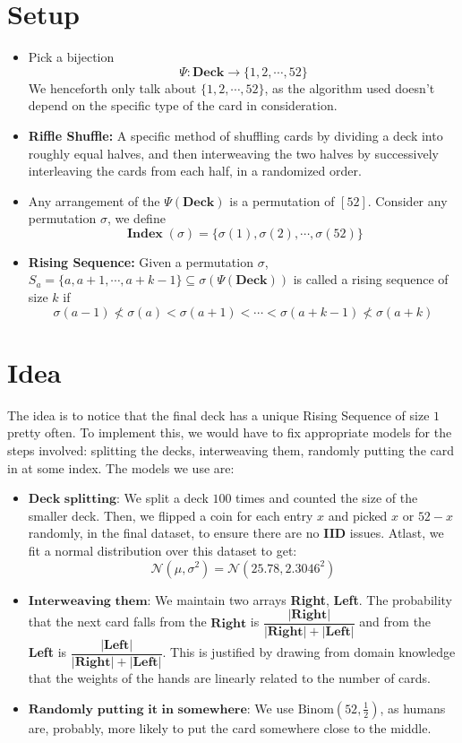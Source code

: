 \documentclass[a4paper]{article}
\DeclareMathOperator*{\Index}{\textbf{Index}}
\begin{document}
\section{Setup}
\begin{itemize}
    \item Pick a bijection $$\Psi:\textbf{Deck} \to \{1, 2, \cdots, 52\}$$ We 
    henceforth only talk about $\{1, 2, \cdots, 52\}$, as the algorithm used doesn't
    depend on the specific type of the card in consideration. 
    \item \textbf{Riffle Shuffle:} A specific method of shuffling cards by 
    dividing a deck into roughly equal halves, and then interweaving the two 
    halves by successively interleaving the cards from each half, in a randomized
    order. 
    \item Any arrangement of the $\Psi(\textbf{Deck})$ is a permutation of $[52]$. 
    Consider any permutation $\sigma$, we define 
    $$\Index(\sigma) = \{\sigma(1), \sigma(2), \cdots, \sigma(52)\}$$
    \item \textbf{Rising Sequence:} Given a permutation $\sigma$, $S_a = \{a, a+1, \cdots, a + k -1\} \subseteq \sigma(\Psi(\textbf{Deck}))$ is
    called a rising sequence of size $k$ if $$\sigma(a-1) \not< \sigma(a) < \sigma(a+1) < \cdots < \sigma(a+k-1) \not< \sigma(a+k)$$ 
\end{itemize}
\section{Idea}
The idea is to notice that the final deck has a unique Rising Sequence of size $1$
pretty often. 
\newline 
To implement this, we would have to fix appropriate models for the steps involved: 
splitting the decks, interweaving them, randomly putting the card in at some index. 
The models we use are: 
\begin{itemize}
    \item $\textbf{Deck splitting:}$ We split a deck $100$ times and counted the size of the smaller deck. 
    Then, we flipped a coin for each entry $x$ and picked $x$ or $52 - x$ randomly, in the final dataset, to ensure
    there are no \textbf{IID} issues. Atlast, we fit a normal distribution over this dataset to get: 
    $$\mathcal{N}(\mu, \sigma^2) = \mathcal{N}(25.78, 2.3046^2)$$
    \item $\textbf{Interweaving them:}$ We maintain two arrays \textbf{Right}, \textbf{Left}. The probability that 
    the next card falls from the $\textbf{Right}$ is $\dfrac{|\textbf{Right}|}{|\textbf{Right}| + |\textbf{Left}|}$ and 
    from the \textbf{Left} is  $\dfrac{|\textbf{Left}|}{|\textbf{Right}| + |\textbf{Left}|}$. This is justified by drawing from domain knowledge 
    that the weights of the hands are linearly related to the number of cards.
    \item $\textbf{Randomly putting it in somewhere:}$ We use $\text{Binom}(52, \frac{1}{2})$, as humans are, probably, more likely
    to put the card somewhere close to the middle.
\end{itemize}  
\newpage
\end{document}
